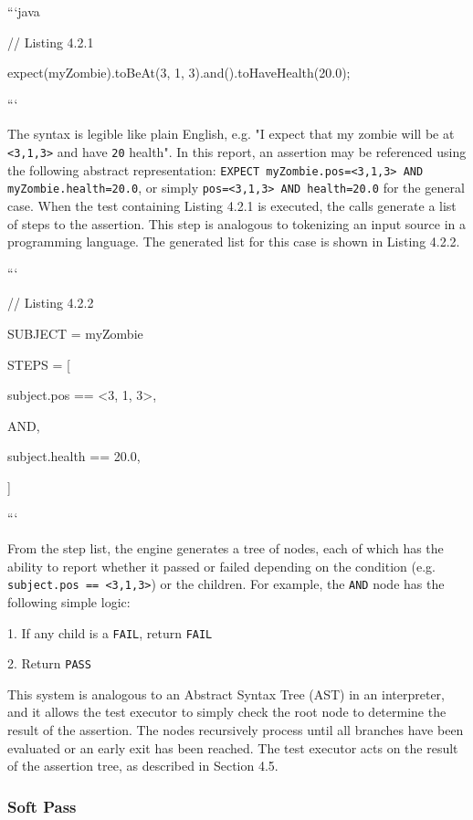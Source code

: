\documentclass{article}
\def\code#1{\texttt{#1}}
\begin{document}
\begin{onehalfspacing}
```java

// Listing 4.2.1

expect(myZombie).toBeAt(3, 1, 3).and().toHaveHealth(20.0);

```

The syntax is legible like plain English, e.g. "I expect that my zombie
will be at \code{\textless3,1,3\textgreater{}} and have \code{20} health". In this
report, an assertion may be referenced using the following abstract
representation: \code{EXPECT myZombie.pos=\textless3,1,3\textgreater{} AND
myZombie.health=20.0}, or simply \code{pos=\textless3,1,3\textgreater{} AND
health=20.0} for the general case. When the test containing Listing 4.2.1
is executed, the calls generate a list of steps to the assertion. This
step is analogous to tokenizing an input source in a programming
language. The generated list for this case is shown in Listing 4.2.2.

```

// Listing 4.2.2

SUBJECT = myZombie

STEPS = {[}

subject.pos == \textless3, 1, 3\textgreater,

AND,

subject.health == 20.0,

{]}

```

From the step list, the engine generates a tree of nodes, each of which
has the ability to report whether it passed or failed depending on the
condition (e.g. \code{subject.pos == \textless3,1,3\textgreater}) or the
children. For example, the \code{AND} node has the following simple logic:

1. If any child is a \code{FAIL}, return \code{FAIL}

2. Return \code{PASS}

This system is analogous to an Abstract Syntax Tree (AST) in an
interpreter, and it allows the test executor to simply check the root
node to determine the result of the assertion. The nodes recursively
process until all branches have been evaluated or an early exit has been
reached. The test executor acts on the result of the assertion tree, as
described in Section 4.5.

\subsubsection{Soft Pass}


\end{onehalfspacing}
\end{document}
